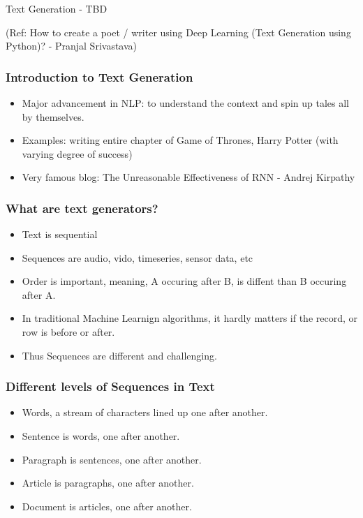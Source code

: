 \begin{frame}[fragile]\frametitle{}

\begin{center}
{\Large Text Generation - TBD}

(Ref: How to create a poet / writer using Deep Learning (Text Generation using Python)? -  Pranjal Srivastava)
\end{center}
\end{frame}


\begin{frame}[fragile]
  \frametitle{Introduction to Text Generation}
  \begin{itemize}
  \item Major advancement in NLP: to understand the context and spin up tales all by themselves.
  \item Examples: writing entire chapter of Game of Thrones, Harry Potter (with varying degree of success)
  \item Very famous blog: The Unreasonable Effectiveness of RNN - Andrej Kirpathy
  	  \end{itemize}
 \end{frame} 

\begin{frame}[fragile]
  \frametitle{What are text generators?}
  \begin{itemize}
  \item Text is sequential
  \item Sequences are audio, vido, timeseries, sensor data, etc
  \item Order is important, meaning, A occuring after B, is diffent than B occuring after A. 
  \item In traditional Machine Learnign algorithms, it hardly matters if the record, or row is before or after.
  \item Thus Sequences are different and challenging.
  	  \end{itemize}
 \end{frame} 

\begin{frame}[fragile]
  \frametitle{Different levels of Sequences in Text}
  \begin{itemize}
  \item Words, a stream of characters lined up one after another. 
  \item Sentence is words, one after another.
  \item Paragraph is sentences, one after another.
  \item Article is paragraphs, one after another.
  \item Document is articles, one after another.
  	  \end{itemize}
 \end{frame} 


